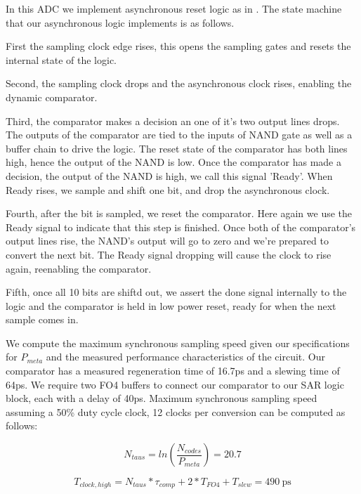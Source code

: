 \documentclass[10pt,journal]{IEEEtran}\usepackage{longtable}
\begin{document}

In this ADC we implement asynchronous reset logic as in \cite{Chen:2006}. The state machine that our asynchronous logic implements is as follows.

First the sampling clock edge rises, this opens the sampling gates and resets the internal state of the logic.

Second, the sampling clock drops and the asynchronous clock rises, enabling the dynamic comparator.

Third, the comparator makes a decision an one of it's two output lines drops. 
The outputs of the comparator are tied to the inputs of NAND gate as well as a buffer chain to drive the logic.
The reset state of the comparator has both lines high, hence the output of the NAND is low.
Once the comparator has made a decision, the output of the NAND is high, we call this signal 'Ready'. When Ready rises, we sample and shift one bit, and drop the asynchronous clock.

Fourth, after the bit is sampled, we reset the comparator. Here again we use the Ready signal to indicate that this step is finished. Once both of the comparator's output lines rise, the NAND's output will go to zero and we're prepared to convert the next bit. The Ready signal dropping will cause the clock to rise again, reenabling the comparator.

Fifth, once all 10 bits are shiftd out, we assert the done signal internally to the logic and the comparator is held in low power reset, ready for when the next sample comes in.

We compute the maximum synchronous sampling speed given our specifications for $P_{meta}$ and the measured performance characteristics of the circuit. Our comparator has a measured regeneration time of 16.7ps and a slewing time of 64ps. We require two FO4 buffers to connect our comparator to our SAR logic block, each with a delay of 40ps. Maximum synchronous sampling speed assuming a 50\% duty cycle clock, 12 clocks per conversion can be computed as follows:

\begin{equation}
  N_{taus} = ln\left(\frac{N_{codes}}{P_{meta}}\right) = 20.7
\end{equation}

\begin{equation}
  T_{clock,high} = N_{taus} * \tau_{comp} + 2 * T_{FO4} + T_{slew} = \SI{490}{\pico\second}
\end{equation}
\end{document}
